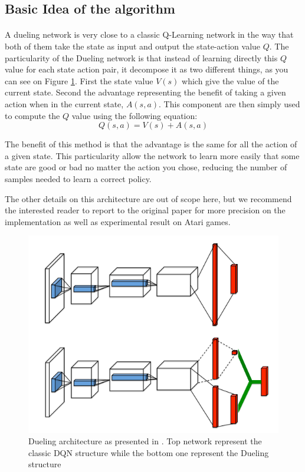 \documentclass[twocolumn,a4paper,10pt]{article}
\begin{document}
\subsection{Basic Idea of the algorithm}

\paragraph{}

A dueling network is very close to a classic Q-Learning network in
the way that both of them take the state as input and output the state-action
value $Q$. The particularity of the Dueling network is that instead
of learning directly this $Q$ value for each state action pair, it
decompose it as two different things, as you can see on Figure \ref{fig:DuelingDQN}.
First the state value $V(s)$ which give the value of the current
state. Second the advantage representing the benefit of taking a given
action when in the current state, $A(s,a)$. This component are then
simply used to compute the $Q$ value using the following equation:
\[
Q(s,a)=V(s)+A(s,a)
\]

The benefit of this method is that the advantage is the same for all
the action of a given state. This particularity allow the network
to learn more easily that some state are good or bad no matter the
action you chose, reducing the number of samples needed to learn a
correct policy.

The other details on this architecture are out of scope here, but
we recommend the interested reader to report to the original paper
\cite{DuelingQL} for more precision on the implementation as well
as experimental result on Atari games.

\begin{figure}
\centering{}\includegraphics[width=0.8\linewidth]{duelingDQN} \caption{Dueling architecture as presented in \cite{DuelingQL}. Top network
represent the classic DQN structure while the bottom one represent
the Dueling structure}
\label{fig:DuelingDQN} 
\end{figure}
\end{document}
